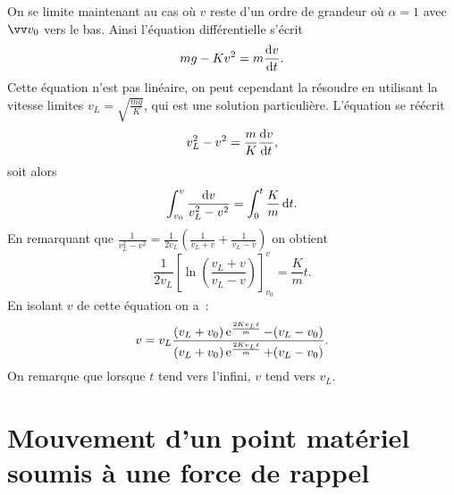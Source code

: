 On se limite maintenant au cas où \(v\) reste d'un ordre de grandeur où \(\alpha=1\) avec \(\vvv_0\) vers le bas. Ainsi l'équation différentielle s'écrit
\begin{equation}
  mg -Kv^2 = m\dfrac{\mathrm{d} v}{\mathrm{d} t}.
\end{equation}
Cette équation n'est pas linéaire, on peut cependant la résoudre en utilisant la vitesse limites \(v_L = \sqrt{\frac{mg}{K}}\), qui est une solution particulière. L'équation se réécrit
\begin{equation}
  v_L^2-v^2 = \frac{m}{K}\dfrac{\mathrm{d} v}{\mathrm{d} t},
\end{equation}
soit alors
\begin{equation}
  \int_{v_0}^v \frac{\mathop{}\mathopen{}\mathrm{d} v}{v_L^2-v^2} = \int_0^t\frac{K}{m}\mathop{}\mathopen{}\mathrm{d} t.
\end{equation}
En remarquant que \(\frac{1}{v_L^2-v^2} = \frac{1}{2 v_L}\left(\frac{1}{v_L+v}+\frac{1}{v_L-v}\right)\) on obtient
\begin{equation}
  \frac{1}{2v_L}\left[\ln\left(\frac{v_L+v}{v_L-v}\right)\right]^{v}_{v_0} = \frac{K}{m}t.
\end{equation}
En isolant \(v\) de cette équation on a~:
\begin{equation}
  v = v_L \frac{(v_L+v_0)\operatorname{e}^{\frac{2K v_L t}{m}}-(v_L-v_0)}{(v_L+v_0)\operatorname{e}^{\frac{2K v_L t}{m}}+(v_L-v_0)}.
\end{equation}
On remarque que lorsque \(t\) tend vers l'infini, \(v\) tend vers \(v_L\).
\section{Mouvement d'un point matériel soumis à une force de rappel}
\label{chap3-sec:mouvementdunpointmaterielsoumisauneforcederappel}
